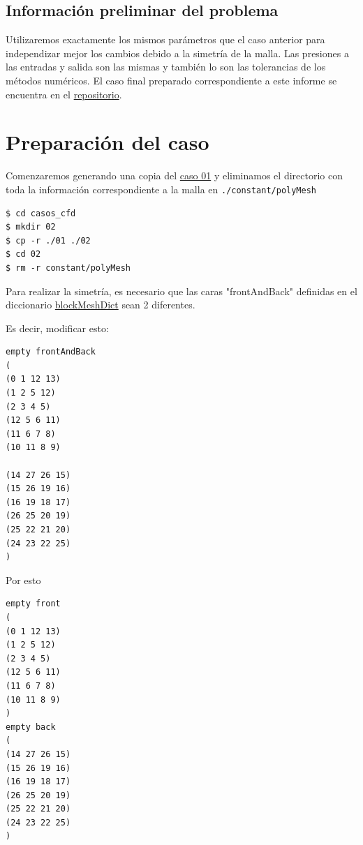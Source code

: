 \documentclass{article}
\begin{document}
\subsection{Información preliminar del problema}

Utilizaremos exactamente los mismos parámetros que el caso anterior para independizar mejor los cambios debido a la simetría de la malla. Las presiones a las entradas y salida son las mismas y también lo son las tolerancias de los métodos numéricos.
El caso final preparado correspondiente a este informe se encuentra en el \href{https://github.com/guillerolle/casos_cfd/tree/master/02}{repositorio}.

\section{Preparación del caso}
Comenzaremos generando una copia del \href{https://github.com/guillerolle/casos_cfd/tree/master/01}{caso 01} y eliminamos el directorio con toda la información correspondiente a la malla en \texttt{./constant/polyMesh}
\begin{lstlisting}
$ cd casos_cfd
$ mkdir 02
$ cp -r ./01 ./02
$ cd 02
$ rm -r constant/polyMesh
\end{lstlisting}

Para realizar la simetría, es necesario que las caras "frontAndBack" definidas en el diccionario \href{https://github.com/guillerolle/casos_cfd/blob/master/02/system/blockMeshDict}{blockMeshDict}  sean 2 diferentes.

Es decir, modificar esto:
\begin{lstlisting}
empty frontAndBack
(
(0 1 12 13)
(1 2 5 12)
(2 3 4 5)
(12 5 6 11)
(11 6 7 8)
(10 11 8 9)

(14 27 26 15)
(15 26 19 16)
(16 19 18 17)
(26 25 20 19)	
(25 22 21 20)
(24 23 22 25)
)
\end{lstlisting}
Por esto
\begin{lstlisting}
empty front
(
(0 1 12 13)
(1 2 5 12)
(2 3 4 5)
(12 5 6 11)
(11 6 7 8)
(10 11 8 9)
)
empty back
(
(14 27 26 15)
(15 26 19 16)
(16 19 18 17)
(26 25 20 19)
(25 22 21 20)
(24 23 22 25)
)
\end{lstlisting}

%
\end{document}
